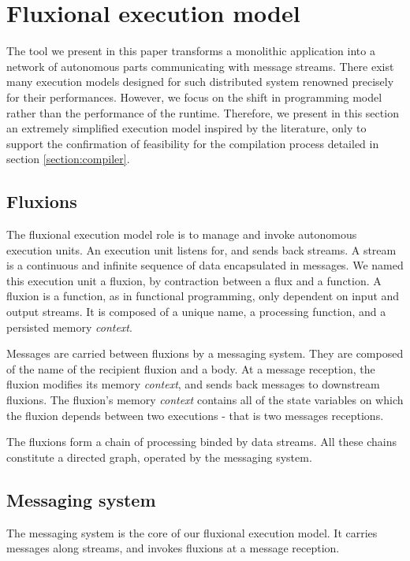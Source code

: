 \section{Fluxional execution model} \label{section:model}

The tool we present in this paper transforms a monolithic application into a network of autonomous parts communicating with message streams.
There exist many execution models designed for such distributed system renowned precisely for their performances\cite{Welsh2000, Jain2006, Wu2007, Zaharia2010, Akidau2013, Marz2011}.
However, we focus on the shift in programming model rather than the performance of the runtime.
Therefore, we present in this section an extremely simplified execution model inspired by the literature, only to support the confirmation of feasibility for the compilation process detailed in section \ref{section:compiler}.

\subsection{Fluxions}

The fluxional execution model role is to manage and invoke autonomous execution units.
An execution unit listens for, and sends back streams.
A stream is a continuous and infinite sequence of data encapsulated in messages.
We named this execution unit a fluxion, by contraction between a flux and a function.
A fluxion is a function, as in functional programming, only dependent on input and output streams.
It is composed of a unique name, a processing function, and a persisted memory \textit{context}.

Messages are carried between fluxions by a messaging system.
They are composed of the name of the recipient fluxion and a body.
At a message reception, the fluxion modifies its memory \textit{context}, and sends back messages to downstream fluxions.
The fluxion's memory \textit{context} contains all of the state variables on which the fluxion depends between two executions - that is two messages receptions.

The fluxions form a chain of processing binded by data streams.
All these chains constitute a directed graph, operated by the messaging system.

\subsection{Messaging system}

The messaging system is the core of our fluxional execution model.
It carries messages along streams, and invokes fluxions at a message reception.

